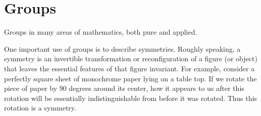 
\section{Groups}
\label{sec:groups}

Groups in many areas of mathematics, both pure and applied.

One important use of groups is to describe symmetries.
Roughly speaking, a symmetry is an invertible transformation or reconfiguration of a figure (or object) that leaves the essential features of that figure invariant.
For example, consider a perfectly square sheet of monochrome paper lying on a table top.
If we rotate the piece of paper by 90 degrees around its center, how it appears to us after this rotation will be essentially indistinguishable from before it was rotated.
Thus this rotation is a symmetry.



